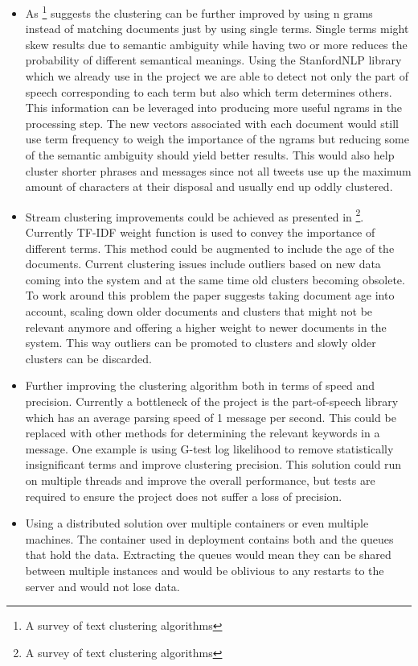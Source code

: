 \begin{itemize}
	\item As \footnote{A survey of text clustering algorithms} suggests the clustering can be further improved by using n grams instead of matching documents just by using single terms. Single terms might skew results due to semantic ambiguity while having two or more reduces the probability of different semantical meanings. Using the StanfordNLP library which we already use in the project we are able to detect not only the part of speech corresponding to each term but also which term determines others. This information can be leveraged into producing more useful ngrams in the processing step. The new vectors associated with each document would still use term frequency to weigh the importance of the ngrams but reducing some of the semantic ambiguity should yield better results. This would also help cluster shorter phrases and messages since not all tweets use up the maximum amount of characters at their disposal and usually end up oddly clustered.
	\item Stream clustering improvements could be achieved as presented in \footnote{A survey of text clustering algorithms}. Currently TF-IDF weight function is used to convey the importance of different terms. This method could be augmented to include the age of the documents. Current clustering issues include outliers based on new data coming into the system and at the same time old clusters becoming obsolete. To work around this problem the paper suggests taking document age into account, scaling down older documents and clusters that might not be relevant anymore and offering a higher weight to newer documents in the system. This way outliers can be promoted to clusters and slowly older clusters can be discarded.
	\item Further improving the clustering algorithm both in terms of speed and precision. Currently a bottleneck of the project is the part-of-speech library which has an average parsing speed of 1 message per second. This could be replaced with other methods for determining the relevant keywords in a message. One example is using G-test log likelihood to remove statistically insignificant terms and improve clustering precision. This solution could run on multiple threads and improve the overall performance, but tests are required to ensure the project does not suffer a loss of precision.
	\item Using a distributed solution over multiple containers or even multiple machines. The container used in deployment contains both {\project}  and the queues that hold the data. Extracting the queues would mean they can be shared between multiple instances and would be oblivious to any restarts to the server and would not lose data.

\end{itemize}
